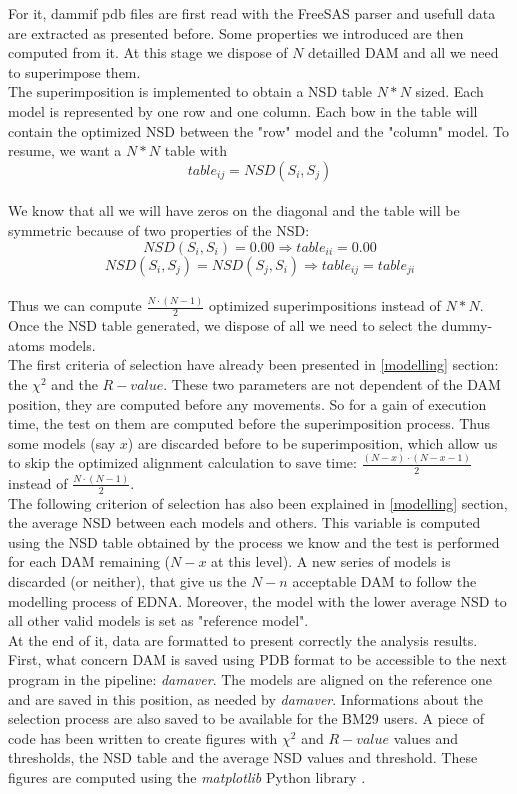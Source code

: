 \documentclass[a4paper, 11pt]{report}
\begin{document}
For it, dammif pdb files are first read with the FreeSAS parser and 
usefull data are extracted as presented before. 
Some properties we introduced are then computed from it. 
At this stage we dispose of $N$ detailled DAM and all we need to 
superimpose them.\\
The superimposition is implemented to obtain a NSD table $N*N$ sized. 
Each model is represented by one row and one column. 
Each bow in the table will contain the optimized NSD between the "row" 
model and the "column" model. 
To resume, we want a $N*N$ table with 
\[
table_{ij}=NSD(S_{i},S_{j})
\]\\ 
We know that all we will have zeros on the diagonal and the table will 
be symmetric because of two properties of the NSD:
\[
NSD(S_{i},S_{i})=0.00 \Rightarrow table_{ii}=0.00
\]
\[
NSD(S_{i},S_{j}) = NSD(S_{j},S_{i}) \Rightarrow table_{ij}=table_{ji}
\]\\
Thus we can compute $\frac{N \cdot (N-1)}{2}$ optimized 
superimpositions instead of $N*N$.\\

Once the NSD table generated, we dispose of all we need to select the 
dummy-atoms models.\\
The first criteria of selection have already been presented in 
\ref{modelling} section: the $\chi^2$ and the $R-value$. 
These two parameters are not dependent of the DAM position, they are 
computed before any movements. 
So for a gain of execution time, the test on them are computed before 
the superimposition process. 
Thus some models (say $x$) are discarded before to be superimposition, 
which allow us to skip the optimized alignment calculation to save 
time: $\frac{(N-x) \cdot (N-x-1)}{2}$ instead of 
$\frac{N \cdot (N-1)}{2}$.\\
The following criterion of selection has also been explained in 
\ref{modelling} section, the average NSD between each models and 
others. 
This variable is computed using the NSD table obtained by the process 
we know and the test is performed for each DAM remaining ($N-x$ at 
this level). 
A new series of models is discarded (or neither), that give us the 
$N-n$ acceptable DAM to follow the modelling process of EDNA. 
Moreover, the model with the lower average NSD to all other valid 
models is set as "reference model".\\

At the end of it, data are formatted to present correctly the analysis 
results. 
First, what concern DAM is saved using PDB format to be accessible to 
the next program in the pipeline: \textit{damaver}. 
The models are aligned on the reference one and are saved in this 
position, as needed by \textit{damaver}. 
Informations about the selection process are also saved to be 
available for the BM29 users. 
A piece of code has been written to create figures with $\chi^2$ and 
$R-value$ values and thresholds, the NSD table and the average NSD 
values and threshold. 
These figures are computed using the \textit{matplotlib} Python 
library \cite{matplotlib}.\\
\end{document}
